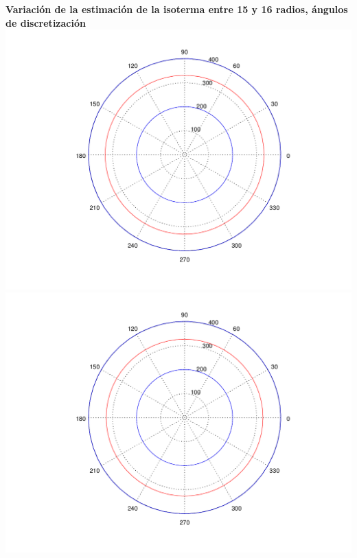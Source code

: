 \begin{enumerate}
	  	\textbf{Variación de la estimación de la isoterma entre 15 y 16 radios, ángulos de discretización}\\
		\includegraphics[scale=0.35]{experimentos1a_1b/evolucion_posicion_isoterma_temperatura/variacion_radios_angulos_se_reduce_diferencia_radial/test11_testord_045_inst_001_isomap.png}
		\includegraphics[scale=0.35]{experimentos1a_1b/evolucion_posicion_isoterma_temperatura/variacion_radios_angulos_se_reduce_diferencia_radial/test11_testord_046_inst_001_isomap.png}


\end{enumerate}
